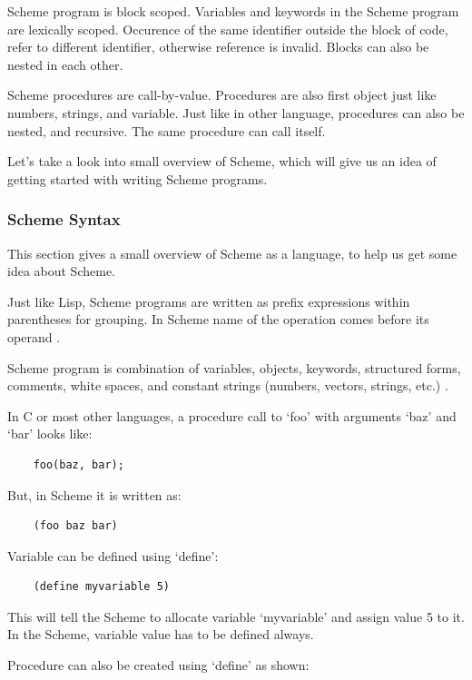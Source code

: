 Scheme program is block scoped. Variables and keywords in the Scheme program are lexically scoped. Occurence of the same identifier outside the block of code, refer to different identifier, otherwise reference is invalid. Blocks can also be nested in each other.

Scheme procedures are call-by-value. Procedures are also first object just like numbers, strings, and variable. Just like in other language, procedures can also be nested, and recursive. The same procedure can call itself. 

Let's take a look into small overview of Scheme, which will give us an idea of getting started with writing Scheme programs.

\subsubsection{Scheme Syntax}

This section gives a small overview of Scheme as a language, to help us get some idea about Scheme.

Just like Lisp, Scheme programs are written as prefix expressions within parentheses for grouping. In Scheme name of the operation comes before its operand \cite{Krishnamurthi:1994:IS:197149.197166}.

Scheme program is combination of variables, objects, keywords, structured forms, comments, white spaces, and constant strings (numbers, vectors, strings, etc.)  \cite{SchemeLanguage}.


In C or most other languages, a procedure call to `foo' with arguments `baz' and `bar' looks like: 

\begin{lstlisting}
	foo(baz, bar);
\end{lstlisting}

But, in Scheme it is written as: 

\begin{lstlisting}
	(foo baz bar)
\end{lstlisting}

Variable can be defined using `define':

\begin{lstlisting} 
	(define myvariable 5)
\end{lstlisting}

This will tell the Scheme to allocate variable `myvariable' and assign value 5 to it. In the Scheme, variable value has to be defined always.

Procedure can also be created using `define' as shown:

